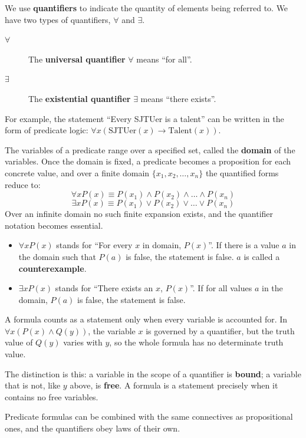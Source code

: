 \begin{definition}[Quantifiers]
We use \textbf{quantifiers} to indicate the quantity of elements being referred to. We have two types of quantifiers, $\forall$ and $\exists$.
\begin{description}
    \item[$\forall$] The \textbf{universal quantifier} $\forall$ means “for all”.
    \item[$\exists$] The \textbf{existential quantifier} $\exists$ means “there exists”.
\end{description}
\end{definition}

For example, the statement “Every SJTUer is a talent” can be written in the form of predicate logic: $\forall x (\text{SJTUer}(x) \to \text{Talent}(x))$.

The variables of a predicate range over a specified set, called the \textbf{domain} of the variables. Once the domain is fixed, a predicate becomes a proposition for each concrete value, and over a finite domain $\{x_1, x_2, \dots, x_n\}$ the quantified forms reduce to:
$$ \forall x P(x) \equiv P(x_1) \wedge P(x_2) \wedge \dots \wedge P(x_n) $$
$$ \exists x P(x) \equiv P(x_1) \vee P(x_2) \vee \dots \vee P(x_n) $$
Over an infinite domain no such finite expansion exists, and the quantifier notation becomes essential.
\begin{itemize}
    \item $\forall x P(x)$ stands for “For every $x$ in domain, $P(x)$”. If there is a value $a$ in the domain such that $P(a)$ is false, the statement is false. $a$ is called a \textbf{counterexample}.
    \item $\exists x P(x)$ stands for “There exists an $x$, $P(x)$”. If for all values $a$ in the domain, $P(a)$ is false, the statement is false.
\end{itemize}

A formula counts as a statement only when every variable is accounted for. In $\forall x (P(x) \wedge Q(y))$, the variable $x$ is governed by a quantifier, but the truth value of $Q(y)$ varies with $y$, so the whole formula has no determinate truth value.

The distinction is this: a variable in the scope of a quantifier is \textbf{bound}; a variable that is not, like $y$ above, is \textbf{free}. A formula is a statement precisely when it contains no free variables.

Predicate formulas can be combined with the same connectives as propositional ones, and the quantifiers obey laws of their own.

